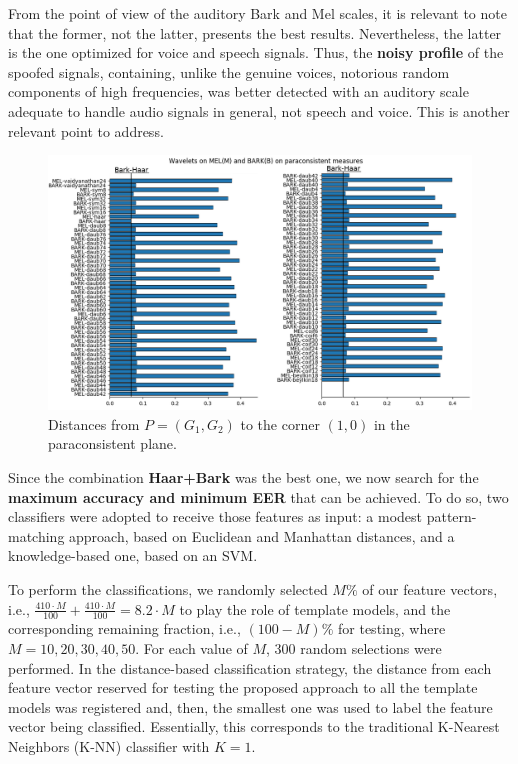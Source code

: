 \par From the point of view of the auditory Bark and Mel scales, it is relevant to note that the former, not the latter, presents the best results. Nevertheless, the latter is the one optimized for voice and speech signals. Thus, the \textbf{noisy profile} of the spoofed signals, containing, unlike the genuine voices, notorious random components of high frequencies, was better detected with an auditory scale adequate to handle audio signals in general, not speech and voice. This is another relevant point to address. 
\begin{figure}[H]
	\centering
	\includegraphics[scale=.55]{images/results/paraconsistentPlane/ParaconsistentFull.png}
	\caption{Distances from $P=(G_1,G_2)$ to the corner $(1,0)$ in the paraconsistent plane.}
	\label{fig:paraconsistentfull}
\end{figure}

\par Since the combination \textbf{Haar+Bark} was the best one, we now search for the \textbf{maximum accuracy and minimum EER} that can be achieved. To do so, two classifiers were adopted to receive those features as input: a modest pattern-matching approach, based on Euclidean and Manhattan distances, and a knowledge-based one, based on an SVM. 
\\
\par To perform the classifications, we randomly selected $M\%$ of our feature vectors, i.e., $\frac{410 \cdot M}{100} + \frac{410 \cdot M}{100} = 8.2 \cdot M$ to play the role of template models, and the corresponding remaining fraction, i.e., $(100-M)\%$ for testing, where $M=10, 20, 30, 40, 50$. For each value of $M$, 300 random selections were performed. In the distance-based classification strategy, the distance from each feature vector reserved for testing the proposed approach to all the template models was registered and, then, the smallest one was used to label the feature vector being classified. Essentially, this corresponds to the traditional K-Nearest Neighbors (K-NN) classifier with $K=1$.     
